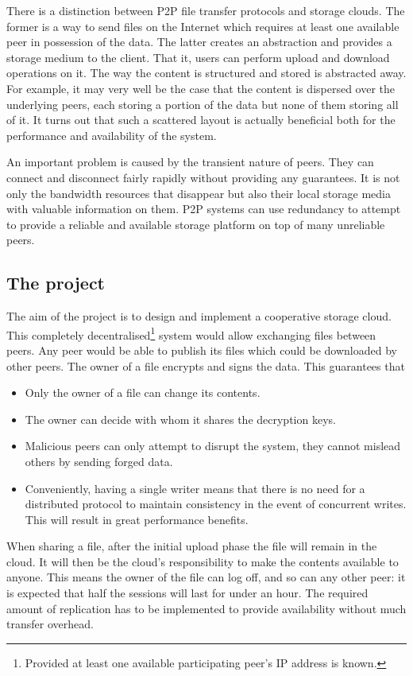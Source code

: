 \documentclass[12pt]{article}
\begin{document}
There is a distinction between P2P file transfer protocols and storage clouds. The former is a way to send files on the Internet which requires at least one available peer in possession of the data. The latter creates an abstraction and provides a storage medium to the client. That it, users can perform upload and download operations on it. The way the content is structured and stored is abstracted away. For example, it may very well be the case that the content is dispersed over the underlying peers, each storing a portion of the data but none of them storing all of it. It turns out that such a scattered layout is actually beneficial both for the performance and availability of the system.

An important problem is caused by the transient nature of peers. They can connect and disconnect fairly rapidly without providing any guarantees. It is not only the bandwidth resources that disappear but also their local storage media with valuable information on them. P2P systems can use redundancy to attempt to provide a reliable and available storage platform on top of many unreliable peers.

\subsection{The project}
The aim of the project is to design and implement a cooperative storage cloud. This completely decentralised\footnote{Provided at least one available participating peer's IP address is known.} system would allow exchanging files between peers. Any peer would be able to publish its files which could be downloaded by other peers. The owner of a file encrypts and signs the data. This guarantees that

\begin{itemize}
\item{Only the owner of a file can change its contents.}
\item{The owner can decide with whom it shares the decryption keys.}
\item{Malicious peers can only attempt to disrupt the system, they cannot mislead others by sending forged data.}
\item{Conveniently, having a single writer means that there is no need for a distributed protocol to maintain consistency in the event of concurrent writes. This will result in great performance benefits.}
\end{itemize}


When sharing a file, after the initial upload phase the file will remain in the cloud. It will then be the cloud's responsibility to make the contents available to anyone. This means the owner of the file can log off, and so can any other peer: it is expected that half the sessions will last for under an hour. The required amount of replication has to be implemented to provide availability without much transfer overhead.
\end{document}
